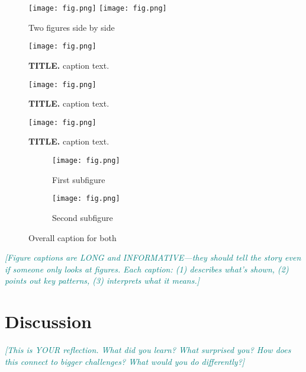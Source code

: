 \documentclass[11pt,letterpaper]{article}
\newcommand{\hint}[1]{\textcolor{teal}{\small\textit{[#1]}}}
\begin{document}
\begin{figure}[h]
    \centering
    \texttt{[image: fig.png]}
    \hfill
    \texttt{[image: fig.png]}
    \caption{Two figures side by side}
\end{figure}

\begin{figure}[h]
    \centering
    \texttt{[image: fig.png]}
    \caption{\textbf{TITLE.} caption text.}
    \label{fig:4}
\end{figure}

\begin{figure}[h]
    \centering
    \texttt{[image: fig.png]}
    \caption{\textbf{TITLE.} caption text.}
    \label{fig:5}
\end{figure}

\begin{figure}[h]
    \centering
    \texttt{[image: fig.png]}
    \caption{\textbf{TITLE.} caption text.}
    \label{fig:6}
\end{figure}

\begin{figure}[H]
    \centering
    \begin{subfigure}{0.48\textwidth}
        \texttt{[image: fig.png]}
        \caption{First subfigure}
        \label{fig:sub1}
    \end{subfigure}
    \hfill  %
    \begin{subfigure}{0.48\textwidth}
        \texttt{[image: fig.png]}
        \caption{Second subfigure}
        \label{fig:sub2}
    \end{subfigure}
    \caption{Overall caption for both}
    \label{fig:both}
\end{figure}

\hint{Figure captions are LONG and INFORMATIVE—they should tell the story even if someone only looks at figures. Each caption: (1) describes what's shown, (2) points out key patterns, (3) interprets what it means.}
\clearpage
\section{Discussion}

\hint{This is YOUR reflection. What did you learn? What surprised you? How does this connect to bigger challenges? What would you do differently?}
\end{document}
